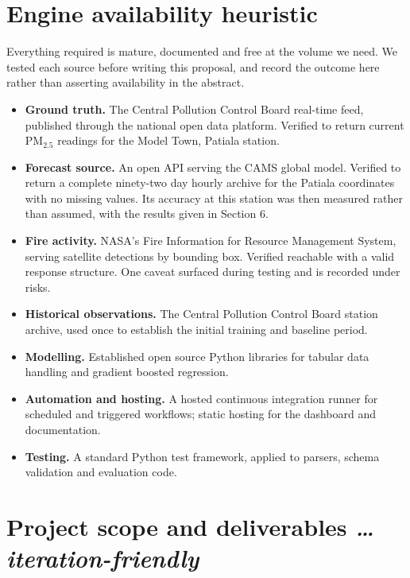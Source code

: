 \documentclass[11pt,a4paper]{article}
\newcommand{\BvrHint}[1]{%
  {\normalfont\normalsize\itshape\hfill #1}}
\begin{document}
\section{Engine availability heuristic}
Everything required is mature, documented and free at
the volume we need. We tested each source before writing
this proposal, and record the outcome here rather than
asserting availability in the abstract.

\begin{itemize}[leftmargin=0.7cm]
  \item \textbf{Ground truth.} The Central Pollution
    Control Board real-time feed, published through the
    national open data platform. Verified to return
    current PM$_{2.5}$ readings for the Model Town,
    Patiala station.
  \item \textbf{Forecast source.} An open API serving the
    CAMS global model. Verified to return a complete
    ninety-two day hourly archive for the Patiala coordinates
    with no missing values. Its accuracy at this station was
    then measured rather than assumed, with the results given
    in Section 6.
  \item \textbf{Fire activity.} NASA's Fire Information
    for Resource Management System, serving satellite
    detections by bounding box. Verified reachable with
    a valid response structure. One caveat surfaced
    during testing and is recorded under risks.
  \item \textbf{Historical observations.} The Central
    Pollution Control Board station archive, used once
    to establish the initial training and baseline
    period.
  \item \textbf{Modelling.} Established open source
    Python libraries for tabular data handling and
    gradient boosted regression.
  \item \textbf{Automation and hosting.} A hosted
    continuous integration runner for scheduled and
    triggered workflows; static hosting for the
    dashboard and documentation.
  \item \textbf{Testing.} A standard Python test
    framework, applied to parsers, schema validation and
    evaluation code.
\end{itemize}

\section{Project scope and deliverables %
\BvrHint{\ldots iteration-friendly}}
\end{document}

